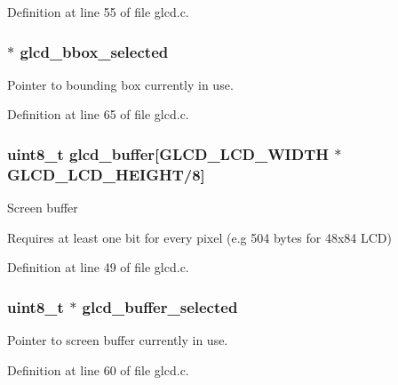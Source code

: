 Definition at line 55 of file glcd.\+c.

\hypertarget{group___global_vars_ga03b7bab8dce1a74310e1de15e1b7cb36}{}
\subsubsection[{glcd\+\_\+bbox\+\_\+selected}]{ $\ast$ glcd\+\_\+bbox\+\_\+selected}\label{group___global_vars_ga03b7bab8dce1a74310e1de15e1b7cb36}
Pointer to bounding box currently in use. 

Definition at line 65 of file glcd.\+c.

\hypertarget{group___global_vars_ga889ec8484defa014e3d9f22f576c7083}{}
\subsubsection[{glcd\+\_\+buffer}]{\setlength{\rightskip}{0pt plus 5cm}uint8\+\_\+t glcd\+\_\+buffer\mbox{[}{\bf G\+L\+C\+D\+\_\+\+L\+C\+D\+\_\+\+W\+I\+D\+T\+H} $\ast${\bf G\+L\+C\+D\+\_\+\+L\+C\+D\+\_\+\+H\+E\+I\+G\+H\+T}/8\mbox{]}}\label{group___global_vars_ga889ec8484defa014e3d9f22f576c7083}
Screen buffer

Requires at least one bit for every pixel (e.\+g 504 bytes for 48x84 L\+C\+D) 

Definition at line 49 of file glcd.\+c.

\hypertarget{group___global_vars_ga8c28e20f1f4105bea86f28bf9db61059}{}
\subsubsection[{glcd\+\_\+buffer\+\_\+selected}]{\setlength{\rightskip}{0pt plus 5cm}uint8\+\_\+t $\ast$ glcd\+\_\+buffer\+\_\+selected}\label{group___global_vars_ga8c28e20f1f4105bea86f28bf9db61059}
Pointer to screen buffer currently in use. 

Definition at line 60 of file glcd.\+c.

